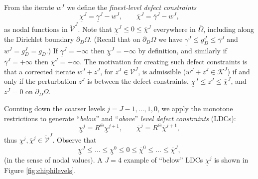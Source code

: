 \documentclass[letterpaper,final,12pt,reqno]{amsart}
\theoremstyle{cstyle}
\theoremstyle{cstyle*}
\theoremstyle{dstyle}
\numberwithin{equation}{section}
\numberwithin{figure}{section}
\numberwithin{table}{section}
\numberwithin{theorem}{section}
\newcommand{\cK}{\mathcal{K}}
\newcommand{\cV}{\mathcal{V}}
\newcommand{\maxR}{R^{\bm{\oplus}}}
\newcommand{\minR}{R^{\bm{\ominus}}}
\begin{document}
From the iterate $w^J$ we define the \emph{finest-level defect constraints}
\begin{equation}
\underline{\chi}^J = \underline{\gamma}^J - w^J, \qquad \overline{\chi}^J = \overline{\gamma}^J - w^J, \label{eq:fe:defectconstraints}
\end{equation}
as nodal functions in $\tilde{\mathcal{V}}^J$.  Note that $\underline{\chi}^J \le 0 \le \overline{\chi}^J$ everywhere in $\overline{\Omega}$, including along the Dirichlet boundary $\partial_D\Omega$.  (Recall that on $\partial_D\Omega$ we have $\underline{\gamma}^J \le g_D^J \le \overline{\gamma}^J$ and $w^J = g_D^J = g_D$.)  If $\underline{\gamma}^J=-\infty$ then $\underline{\chi}^J=-\infty$ by definition, and similarly if $\overline{\gamma}^J=+\infty$ then $\overline{\chi}^J=+\infty$.  The motivation for creating such defect constraints \cite{GraeserKornhuber2009} is that a corrected iterate $w^J + z^J$, for $z^J\in\cV^J$, is admissible ($w^J + z^J \in \cK^J$) if and only if the perturbation $z^J$ is between the defect constraints, $\underline{\chi}^J \le z^J \le \overline{\chi}^J$, and $z^J=0$ on $\partial_D\Omega$.

Counting down the coarser levels $j=J-1,\dots,1,0$, we apply the monotone restrictions to generate ``\emph{below}'' and ``\emph{above}'' \emph{level defect constraints} (LDCs):
\begin{equation}
\underline{\chi}^{j} = \maxR \underline{\chi}^{j+1}, \qquad \overline{\chi}^{j} = \minR \overline{\chi}^{j+1}, \label{eq:fe:chilevels}
\end{equation}
thus $\underline{\chi}^{j},\overline{\chi}^{j} \in \tilde{\mathcal{V}}^J$.  Observe that
\begin{equation}
\underline{\chi}^{J} \le \dots \le \underline{\chi}^0 \le 0 \le \overline{\chi}^0 \le \dots \le \overline{\chi}^J, \label{eq:fe:chiordering}
\end{equation}
(in the sense of nodal values).  A $J=4$ example of ``below'' LDCs $\underline{\chi}^j$ is shown in Figure \ref{fig:chiphilevels}. 
\end{document}
